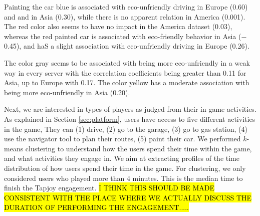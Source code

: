 \documentclass[preprint,authoryear,12pt]{elsarticle}
\begin{document}
Painting the car blue is associated with eco-unfriendly driving in Europe (0.60) and and in Asia (0.30), while there is no apparent relation in America (0.001).
The red color also seems to have no impact in the America dataset (0.03), whereas the red painted car is associated with eco-friendly behavior in Asia ($-$0.45), and haS a slight association with eco-unfriendly driving in Europe (0.26).

The color gray seems to be associated with being more eco-unfriendly in a weak way in every server with the correlation coefficients being greater than 0.11 for Asia, up to Europe with 0.17. The color yellow has a moderate association with being more eco-unfriendly in Asia (0.20).

%





Next, we are interested in types of players as judged from their in-game activities.
As explained in Section \ref{sec:platform}, users have access to five different activities in the game, They can (1) drive, (2) go to the garage, (3) go to gas station, (4) use the navigator tool to plan their routes, (5) paint their car.
We performed $k$-means clustering to understand how the users spend their time within the game, and what activities they engage in. We aim at extracting profiles of the time distribution of how users spend their time in the game.
For clustering, we only considered users who played more than 4 minutes. This is the median time to finish the Tapjoy engagement. \hl{I THINK THIS SHOULD BE MADE CONSISTENT WITH THE PLACE WHERE WE ACTUALLY DISCUSS THE DURATION OF PERFORMING THE ENGAGEMENT.....}
\end{document}
